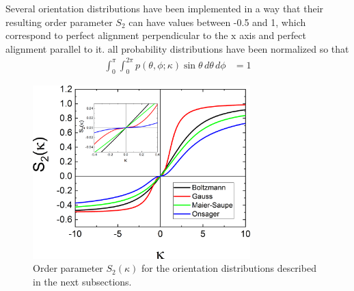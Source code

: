 Several orientation distributions have been implemented in a way that their resulting order parameter $S_2$ can have values between -0.5 and 1, which correspond to perfect alignment perpendicular to the $\mathrm{x}$ axis and perfect alignment parallel to it. all probability distributions have been normalized so that
\begin{align}
\int_0^\pi \int_0^{2\pi} p(\theta,\phi;\kappa) \sin \theta \, d\theta \, d\phi&=1
\end{align}
\begin{figure}[htb]
\begin{center}
\includegraphics[width=0.75\textwidth]{../images/form_factor/cylindrical_obj/S2(kappa).png}
\end{center}
\caption{Order parameter $S_2(\kappa)$ for the orientation distributions described in the next subsections.}
\label{fig:S2_kappa}
\end{figure}

